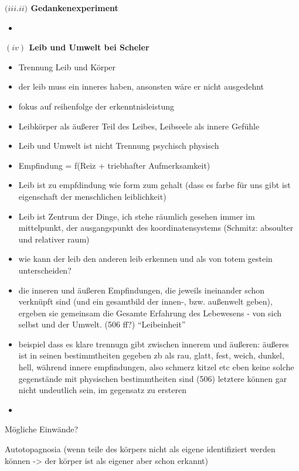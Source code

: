 \documentclass[a4paper, 12pt]{article}
\begin{document}
\begin{onehalfspace}
\vspace{3mm}
\noindent\textbf{$(iii.$\footnotesize$ii$\normalsize$)$ Gedankenexperiment}

\begin{itemize}
  \item 
\end{itemize}


\vspace{5mm}
\noindent\textbf{$(iv)$ Leib und Umwelt bei Scheler}

\begin{itemize}
  \item Trennung Leib und Körper
  \item der leib muss ein inneres haben, ansonsten wäre er nicht ausgedehnt
  \item fokus auf reihenfolge der erkenntnisleistung
  \item Leibkörper als äußerer Teil des Leibes, Leibseele als innere Gefühle
  \item Leib und Umwelt ist nicht Trennung psychisch physisch
  \item Empfindung = f(Reiz + triebhafter Aufmerksamkeit)
  \item Leib ist zu empfdindung wie form zum gehalt (dass es farbe für uns gibt ist eigenschaft der menschlichen leiblichkeit)
  \item Leib ist Zentrum der Dinge, ich stehe räumlich gesehen immer im mittelpunkt, der ausgangspunkt des koordinatensystems (Schmitz: absoulter und relativer raum)
  \item wie kann der leib den anderen leib erkennen und als von totem gestein unterscheiden?
  \item die inneren und äußeren Empfindungen, die jeweils ineinander schon verknüpft sind (und ein gesamtbild der innen-, bzw. außenwelt geben), ergeben sie gemeinsam die Gesamte Erfahrung des Lebewesens - von sich selbst und der Umwelt. (506 ff?) "`Leibeinheit"'
  \item beispiel dass es klare trennugn gibt zwischen innerem und äußeren: äußeres ist in seinen bestimmtheiten gegeben zb als rau, glatt, fest, weich, dunkel, hell, während innere empfindungen, also schmerz kitzel etc eben keine solche gegenstände mit physischen bestimmtheiten sind (506) letztere können gar nicht undeutlich sein, im gegensatz zu ersteren
  \item 
\end{itemize}

Mögliche Einwände?

Autotopagnosia (wenn teile des körpers nicht als eigene identifiziert werden können -> der körper ist als eigener aber schon erkannt)


\end{onehalfspace}
\end{document}
